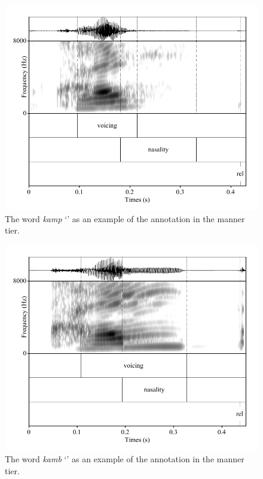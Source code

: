 \documentclass[11pt,a4paper,openany]{memoir}\usepackage[]{graphicx}\usepackage[]{color}
\begin{document}
\begin{figure}
\centering
\includegraphics[width=\textwidth]{kamp}
\caption{The word \textit{kamp} `' as an example of the annotation in the manner tier.}
\label{f:kamp}
\end{figure}

\begin{figure}
\centering
\includegraphics[width=\textwidth]{kamb}
\caption{The word \textit{kamb} `' as an example of the annotation in the manner tier.}
\label{f:kamb}
\end{figure}
\end{document}
